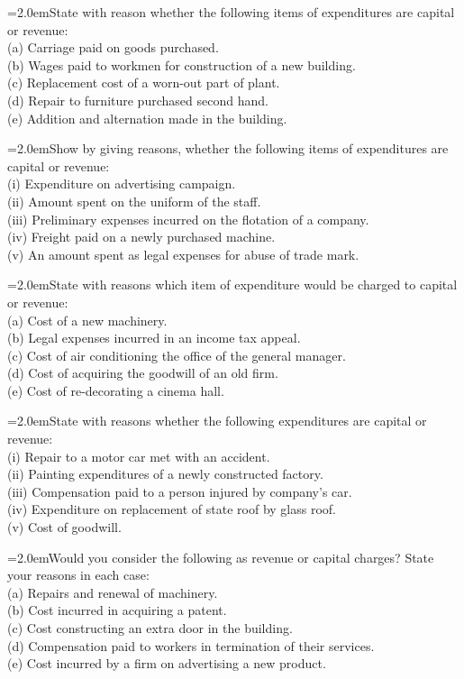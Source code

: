 \documentclass[11pt,a4paper]{article}
\newcommand{\lqn}[2]{\Needspace{6\baselineskip}\par\medskip\noindent\hangindent=2.0em\hangafter=1\makebox[2.0em][l]{\textbf{#1.}}#2\par}
\begin{document}
\lqn{121}{State with reason whether the following items of expenditures are capital or revenue:\\
(a) Carriage paid on goods purchased.\\
(b) Wages paid to workmen for construction of a new building.\\
(c) Replacement cost of a worn-out part of plant.\\
(d) Repair to furniture purchased second hand.\\
(e) Addition and alternation made in the building.\par
}
\lqn{122}{Show by giving reasons, whether the following items of expenditures are capital or revenue:\\
(i) Expenditure on advertising campaign.\\
(ii) Amount spent on the uniform of the staff.\\
(iii) Preliminary expenses incurred on the flotation of a company.\\
(iv) Freight paid on a newly purchased machine.\\
(v) An amount spent as legal expenses for abuse of trade mark.\par
}
\lqn{123}{State with reasons which item of expenditure would be charged to capital or revenue:\\
(a) Cost of a new machinery.\\
(b) Legal expenses incurred in an income tax appeal.\\
(c) Cost of air conditioning the office of the general manager.\\
(d) Cost of acquiring the goodwill of an old firm.\\
(e) Cost of re-decorating a cinema hall.\par
}
\lqn{124}{State with reasons whether the following expenditures are capital or revenue:\\
(i) Repair to a motor car met with an accident.\\
(ii) Painting expenditures of a newly constructed factory.\\
(iii) Compensation paid to a person injured by company's car.\\
(iv) Expenditure on replacement of state roof by glass roof.\\
(v) Cost of goodwill.\par
}
\lqn{125}{Would you consider the following as revenue or capital charges? State your reasons in each case:\\
(a) Repairs and renewal of machinery.\\
(b) Cost incurred in acquiring a patent.\\
(c) Cost constructing an extra door in the building.\\
(d) Compensation paid to workers in termination of their services.\\
(e) Cost incurred by a firm on advertising a new product.\par
}
\end{document}
